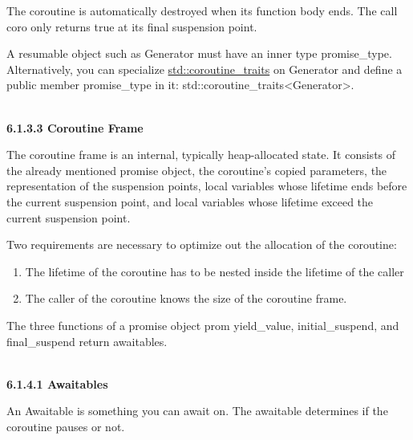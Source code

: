 The coroutine is automatically destroyed when its function body ends. The call coro only returns true at its final suspension point.

\begin{tcolorbox}[colback=red!5!white,colframe=red!75!black,title={The resumable object requires an inner type promise\_type}]
A resumable object such as Generator must have an inner type promise\_type. Alternatively, you can specialize \href{https://en.cppreference.com/w/cpp/coroutine/coroutine_traits}{std::coroutine\_traits} on Generator and define a public member promise\_type in it: std::coroutine\_traits<Generator>.
\end{tcolorbox}

\hspace*{\fill} \\ %
\noindent
\textbf{6.1.3.3\hspace{0.2cm} Coroutine Frame}

The coroutine frame is an internal, typically heap-allocated state. It consists of the already mentioned promise object, the coroutine’s copied parameters, the representation of the suspension points, local variables whose lifetime ends before the current suspension point, and local variables whose lifetime exceed the current suspension point.

Two requirements are necessary to optimize out the allocation of the coroutine:

\begin{enumerate}
\item 
The lifetime of the coroutine has to be nested inside the lifetime of the caller

\item 
The caller of the coroutine knows the size of the coroutine frame.

\end{enumerate}


The three functions of a promise object prom yield\_value, initial\_suspend, and final\_suspend return awaitables.

\hspace*{\fill} \\ %
\noindent
\textbf{6.1.4.1\hspace{0.2cm} Awaitables}

An Awaitable is something you can await on. The awaitable determines if the coroutine pauses or not.

